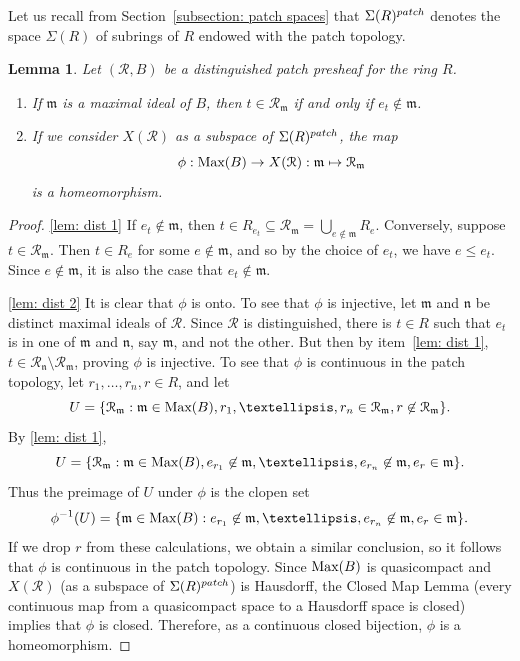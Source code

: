 \documentclass[11pt]{amsart}
\def\m{{\mathfrak m}} %
\newtheorem{lemma}[theorem]{Lemma}
\theoremstyle{definition}
\def\Max{\mbox{\rm Max}}
\def\cal{\mathcal}
\begin{document}
\medskip

Let us recall from Section~\ref{subsection: patch spaces} that ${\Sigma}(R)^{\rm patch}$ denotes the space $\Sigma(R)$ of subrings of $R$ endowed with the patch topology.

\begin{lemma}\label{lem: dist} Let $({\cal R}, B)$ be a distinguished patch presheaf for the ring $R$.
\begin{enumerate}[label=\textup{(\roman{*})}, mode=unboxed]
\item\label{lem: dist 1} If $\m$ is a maximal ideal of $B$, then $t \in {\cal R}_{\m}$ if and only if {$e_t \notin \m$}.
\item\label{lem: dist 2} If we consider $X({\mathcal R})$ as a subspace of  ${\Sigma}(R)^{\rm patch}$, the map $$\phi:\Max(B) \rightarrow X({\mathcal R}):{\mathfrak{m}} \mapsto {\mathcal{R}}_\m$$ is a homeomorphism.
\end{enumerate}
\end{lemma}

\begin{proof} 
\ref{lem: dist 1} If $e_t\notin \m$, then $t\in R_{e_t}\subseteq {\cal R}_{\m}=\bigcup_{e\not\in \m} R_e$. Conversely, suppose $t \in {\cal R}_{\m}$. Then  $t \in R_e$ for some $e\not \in \m$, and so by the choice of $e_t$, we have $e \leq e_t$. Since $e \not \in \m$, it is also the case that $e_t \not \in \m$. 

\ref{lem: dist 2} It is clear that $\phi$ is onto. To see that $\phi$ is injective, let ${\mathfrak{m}}$ and ${\mathfrak{n}}$ be distinct maximal ideals of ${\cal R}$. Since ${\mathcal R}$ is distinguished, there is $t \in R$ such that $e_t $ is in one of $\m$ and ${\mathfrak{n}}$, say $\m$, and not the other. But then by item~\ref{lem: dist 1}, $t  \in   {\cal R}_{\mathfrak{n}} \setminus {\cal R}_{\m}$, proving $\phi$ is injective.  
To see that $\phi$ is continuous in the patch topology, let $r_1,\ldots,r_n,r\in R$, and let 
$$U = \{{\cal R}_{\m}:\m \in \Max(B), r_1,\ldots,r_n \in {\cal R}_{\m}, r \not \in {\cal R}_{\m}\}.$$   
By \ref{lem: dist 1}, 
$$U = \{{\cal R}_{\m}:\m \in \Max(B), e_{r_1} \not \in \m,\ldots, e_{r_n} \not \in \m,e_r \in \m\}.$$ Thus the preimage of $U$ under $\phi$ is the clopen set $$\phi^{-1}(U) = \{\m \in \Max(B): e_{r_1} \not \in \m,\ldots, e_{r_n} \not \in \m,e_r \in \m\}.$$  If we drop $r$ from these calculations, we obtain a similar conclusion, so it follows that $\phi$ is continuous in the patch topology.  
Since $\Max(B)$ is quasicompact and  $X({\mathcal R})$ (as a subspace of ${\Sigma}(R)^{\rm patch}$) is Hausdorff, the Closed Map Lemma (every continuous map from a quasicompact space to a Hausdorff space is closed) implies that $\phi$ is closed. Therefore, as a continuous closed bijection, $\phi$ is a homeomorphism.
\end{proof}
\end{document}
